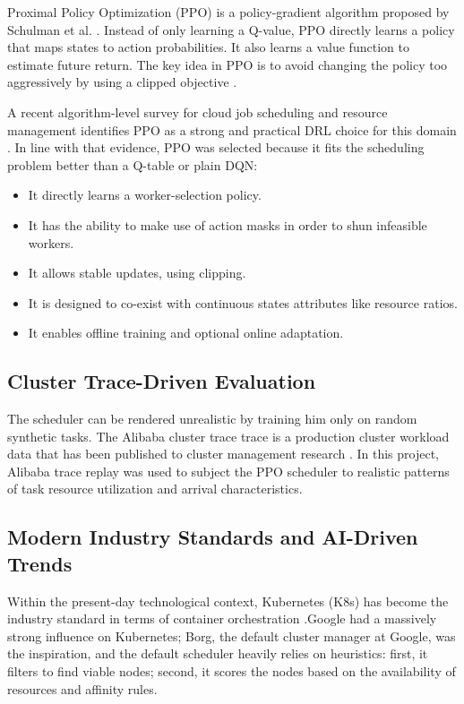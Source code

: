 Proximal Policy Optimization (PPO) is a policy-gradient algorithm proposed by Schulman et al. \cite{schulman2017ppo}. Instead of only learning a Q-value, PPO directly learns a policy that maps states to action probabilities. It also learns a value function to estimate future return. The key idea in PPO is to avoid changing the policy too aggressively by using a clipped objective \cite{schulman2017ppo}.

A recent algorithm-level survey for cloud job scheduling and resource management identifies PPO as a strong and practical DRL choice for this domain \cite{gu2025deeprl}. In line with that evidence, PPO was selected because it fits the scheduling problem better than a Q-table or plain DQN:

\begin{itemize}
    \item It directly learns a worker-selection policy.
    \item It has the ability to make use of action masks in order to shun infeasible workers.
    \item It allows stable updates, using clipping.
    \item It is designed to co-exist with continuous states attributes like resource ratios.
    \item It enables offline training and optional online adaptation.
\end{itemize}

\subsection{Cluster Trace-Driven Evaluation}

The scheduler can be rendered unrealistic by training him only on random synthetic tasks. The Alibaba cluster trace trace is a production cluster workload data that has been published to cluster management research \cite{alibabatrace}. In this project, Alibaba trace replay was used to subject the PPO scheduler to realistic patterns of task resource utilization and arrival characteristics.

\subsection{Modern Industry Standards and AI-Driven Trends}

Within the present-day technological context, Kubernetes (K8s) has become the industry standard in terms of container orchestration \cite{kubernetes2026}.Google had a massively strong influence on Kubernetes; Borg, the default cluster manager at Google, was the inspiration, and the default scheduler heavily relies on heuristics: first, it filters to find viable nodes; second, it scores the nodes based on the availability of resources and affinity rules.

